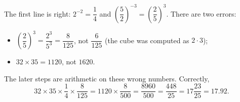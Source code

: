 The first line is right: $2^{-2}=\dfrac14$ and $\left(\dfrac52\right)^{-3}=\left(\dfrac25\right)^3$. There are two errors:
\begin{itemize}
\item $\left(\dfrac25\right)^3=\dfrac{2^3}{5^3}=\dfrac{8}{125}$, not $\dfrac{6}{125}$ (the cube was computed as $2\cdot3$);
\item $32\times35=1120$, not $1620$.
\end{itemize}
The later steps are arithmetic on these wrong numbers. Correctly,
\[32\times35\times\dfrac14\times\dfrac{8}{125}=1120\times\dfrac{8}{500}=\dfrac{8960}{500}=\boxed{\dfrac{448}{25}}=17\dfrac{23}{25}=17.92.\]
